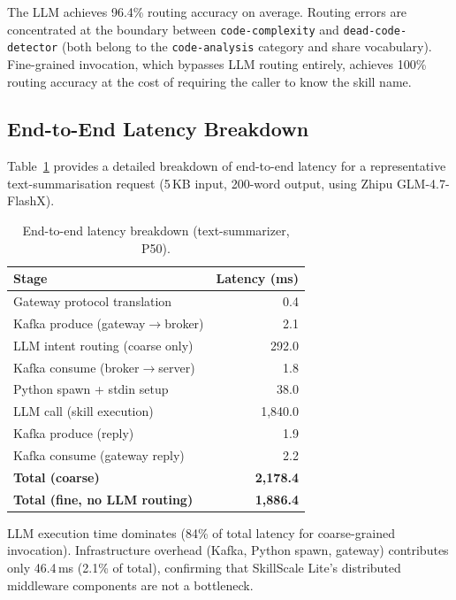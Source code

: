 \documentclass[sigconf,nonacm]{acmart}
\begin{document}
The LLM achieves 96.4\% routing accuracy on average. Routing errors are concentrated at the boundary between \texttt{code-complexity} and \texttt{dead-code-detector} (both belong to the \texttt{code-analysis} category and share vocabulary). Fine-grained invocation, which bypasses LLM routing entirely, achieves 100\% routing accuracy at the cost of requiring the caller to know the skill name.

\subsection{End-to-End Latency Breakdown}

Table~\ref{tab:latency_breakdown} provides a detailed breakdown of end-to-end latency for a representative text-summarisation request (5\,KB input, 200-word output, using Zhipu GLM-4.7-FlashX).

\begin{table}[h]
\centering
\caption{End-to-end latency breakdown (text-summarizer, P50).}
\label{tab:latency_breakdown}
\begin{tabular}{lr}
\toprule
\textbf{Stage} & \textbf{Latency (ms)} \\
\midrule
Gateway protocol translation & 0.4 \\
Kafka produce (gateway$\rightarrow$broker) & 2.1 \\
LLM intent routing (coarse only) & 292.0 \\
Kafka consume (broker$\rightarrow$server) & 1.8 \\
Python spawn + stdin setup & 38.0 \\
LLM call (skill execution) & 1,840.0 \\
Kafka produce (reply) & 1.9 \\
Kafka consume (gateway reply) & 2.2 \\
\midrule
\textbf{Total (coarse)} & \textbf{2,178.4} \\
\textbf{Total (fine, no LLM routing)} & \textbf{1,886.4} \\
\bottomrule
\end{tabular}
\end{table}

LLM execution time dominates (84\% of total latency for coarse-grained invocation). Infrastructure overhead (Kafka, Python spawn, gateway) contributes only 46.4\,ms (2.1\% of total), confirming that SkillScale Lite's distributed middleware components are not a bottleneck.

\end{document}
